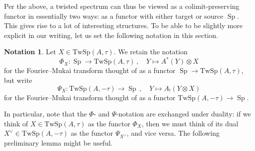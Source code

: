 \documentclass[10pt]{amsart}
\theoremstyle{plain}
\theoremstyle{definition}
\newtheorem{notation}[theorem]{Notation}
\DeclareMathOperator{\Sp}{Sp}
\newcommand{\TwSp}{\mathrm{TwSp}}
\begin{document}
Per the above, a twisted spectrum can thus be viewed as a colimit-preserving functor in essentially two ways: as a functor with either target or source $\Sp$.
 This gives rise to a lot of interesting structures.
 To be able to be slightly more explicit in our writing, let us set the following notation in this section.

\begin{notation}
  Let $X \in \TwSp(A,\tau)$. We retain the notation
  \[
  \Phi_X : \Sp \to \TwSp(A,\tau) \,, \quad Y \mapsto A^*(Y) \otimes X
  \]
  for the Fourier--Mukai transform thought of as a functor $\Sp \to \TwSp(A,\tau)$, but write
  \[
  \Psi_X : \TwSp(A,-\tau) \to \Sp \,, \quad Y \mapsto A_!(Y \otimes X)
  \]
  for the Fourier--Mukai transform thought of as a functor $\TwSp(A,-\tau) \to \Sp$.
\end{notation}

In particular, note that the $\Phi$- and $\Psi$-notation are exchanged under duality: if we think of $X \in \TwSp(A,\tau)$ as the functor $\Phi_X$, then we must think of its dual $X^{\vee} \in \TwSp(A,-\tau)$ as the functor $\Psi_{X^{\vee}}$, and vice versa.
The following preliminary lemma might be useful.
\end{document}

